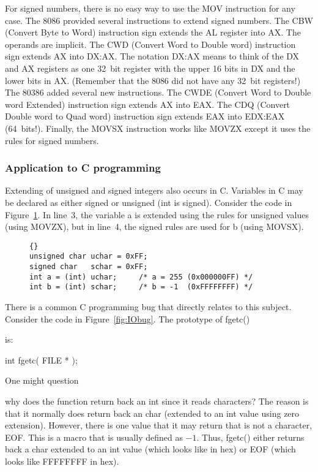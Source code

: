 For signed numbers, there is no easy way to use the {\code MOV}
instruction for any case. The 8086 provided several instructions to
extend signed numbers.  The {\code CBW}  (Convert Byte to
Word) instruction sign extends the AL register into AX. The operands
are implicit. The {\code CWD}  (Convert Word to Double
word) instruction sign extends AX into DX:AX. The notation DX:AX means
to think of the DX and AX registers as one 32~bit register with the
upper 16 bits in DX and the lower bits in AX. (Remember that the 8086
did not have any 32~bit registers!) The 80386 added several new
instructions. The {\code CWDE}  (Convert Word to Double
word Extended) instruction sign extends AX into EAX. The {\code CDQ}
 (Convert Double word to Quad word) instruction sign
extends EAX into EDX:EAX (64~bits!). Finally, the
{\code MOVSX}  instruction works like {\code MOVZX}
except it uses the rules for signed numbers.

\subsubsection{Application to C programming}

Extending  of unsigned and signed integers also occurs
in C. Variables in C may be declared as either signed or unsigned
({\code int} is signed). Consider the code in
Figure~\ref{fig:charExt}.  In line~3, the variable {\code a} is
extended using the rules for unsigned values (using {\code MOVZX}), but in 
line~4, the signed rules are used for {\code b} (using {\code MOVSX}).

\begin{figure}[t]
\begin{lstlisting}[frame=tlrb]{}
unsigned char uchar = 0xFF;
signed char   schar = 0xFF;
int a = (int) uchar;     /* a = 255 (0x000000FF) */
int b = (int) schar;     /* b = -1  (0xFFFFFFFF) */
\end{lstlisting}
\caption{}
\label{fig:charExt}
\end{figure}

There is a common C programming bug that directly relates to this subject.
Consider the code in Figure~\ref{fig:IObug}. The prototype of 
{\code fgetc()}{\samepage is:
\begin{CodeQuote}
int fgetc( FILE * );
\end{CodeQuote}
One might question }why does the function return back an {\code int}
since it reads characters? The reason is that it normally does return
back an {\code char} (extended to an {\code int} value using zero
extension). However, there is one value that it may return that is not
a character, {\code EOF}. This is a macro that is usually defined as
$-1$. Thus, {\code fgetc()} either returns back a {\code char}
extended to an {\code int} value (which looks like {} in hex) or {\code EOF} (which looks like {\code FFFFFFFF} in
hex).

